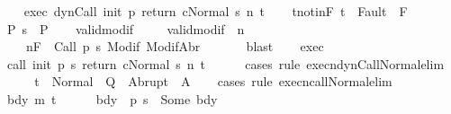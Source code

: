 \begin{isabellebody}
\ \ \isamarkupfalse%
\ exec{\isacharcolon}\ {\isachardoublequoteopen}{\isasymGamma}{\isasymturnstile}{\isasymlangle}dynCall\ init\ p\ return\ c{\isacharcomma}Normal\ s{\isasymrangle}\ {\isacharequal}n{\isasymRightarrow}\ t{\isachardoublequoteclose}\isanewline
\ \ \isamarkupfalse%
\ t{\isacharunderscore}notin{\isacharunderscore}F{\isacharcolon}\ {\isachardoublequoteopen}t\ {\isasymnotin}\ Fault\ {\isacharbackquote}\ F{\isachardoublequoteclose}\isanewline
\ \ \isamarkupfalse%
\ P{\isacharcolon}\ {\isachardoublequoteopen}s\ {\isasymin}\ P{\isachardoublequoteclose}\isanewline
\ \ \isamarkupfalse%
\ valid{\isacharunderscore}modif\ \isanewline
\ \ \isamarkupfalse%
\ valid{\isacharunderscore}modif{\isacharprime}{\isacharcolon}\ {\isachardoublequoteopen}{\isasymforall}{\isasymsigma}{\isachardot}\ {\isasymforall}n{\isachardot}\ \isanewline
\ \ \ \ {\isasymGamma}{\isacharcomma}{\isasymTheta}{\isasymTurnstile}n{\isacharcolon}\isactrlbsub {\isacharslash}F\isactrlesub \ {\isacharbraceleft}{\isasymsigma}{\isacharbraceright}\ Call\ {\isacharparenleft}p\ s{\isacharparenright}\ {\isacharparenleft}Modif\ {\isasymsigma}{\isacharparenright}{\isacharcomma}{\isacharparenleft}ModifAbr\ {\isasymsigma}{\isacharparenright}{\isachardoublequoteclose}\isanewline
\ \ \ \ \isamarkupfalse%
\ blast\isanewline
\ \ \isamarkupfalse%
\ exec\isanewline
\ \ \isamarkupfalse%
\ {\isachardoublequoteopen}{\isasymGamma}{\isasymturnstile}{\isasymlangle}call\ init\ {\isacharparenleft}p\ s{\isacharparenright}\ return\ c{\isacharcomma}Normal\ s{\isasymrangle}\ {\isacharequal}n{\isasymRightarrow}\ t{\isachardoublequoteclose}\isanewline
\ \ \ \ \isamarkupfalse%
\ {\isacharparenleft}cases\ rule{\isacharcolon}\ execn{\isacharunderscore}dynCall{\isacharunderscore}Normal{\isacharunderscore}elim{\isacharparenright}\isanewline
\ \ \isamarkupfalse%
\ \isamarkupfalse%
\ {\isachardoublequoteopen}t\ {\isasymin}\ Normal\ {\isacharbackquote}\ Q\ {\isasymunion}\ Abrupt\ {\isacharbackquote}\ A{\isachardoublequoteclose}\isanewline
\ \ \isamarkupfalse%
\ {\isacharparenleft}cases\ rule{\isacharcolon}\ execn{\isacharunderscore}call{\isacharunderscore}Normal{\isacharunderscore}elim{\isacharparenright}\isanewline
\ \ \ \ \isamarkupfalse%
\ bdy\ m\ t{\isacharprime}\isanewline
\ \ \ \ \isamarkupfalse%
\ bdy{\isacharcolon}\ {\isachardoublequoteopen}{\isasymGamma}\ {\isacharparenleft}p\ s{\isacharparenright}\ {\isacharequal}\ Some\ bdy{\isachardoublequoteclose}\isanewline

\end{isabellebody}
